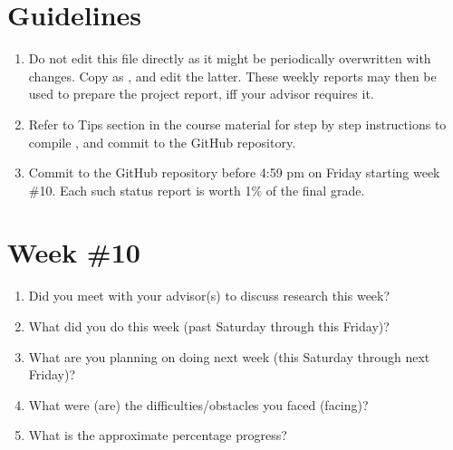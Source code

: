 \documentclass[letterpaper,12pt,fleqn]{article}
\begin{document}
\thispagestyle{empty}

\statustitle

\section*{Guidelines}

\begin{enumerate}
  \item Do not edit this file directly as it might be periodically
        overwritten with changes. Copy  as 
        , and edit the latter. These weekly
        reports may then be used to prepare the project report, iff your
        advisor requires it.
  \item Refer to \textsf{Tips} section in the course material for step by
        step instructions to compile , 
        and commit  to the GitHub repository.
  \item Commit  to the GitHub repository 
        before 4:59 pm on Friday starting week \#10. Each such status report 
        is worth 1\% of the final grade.
\end{enumerate}

\clearpage
\section*{Week \#10}

\begin{spacing}{1.50}
  \begin{enumerate}
    \item Did you meet with your advisor(s) to discuss research this week?
          \vfill

    \item What did you do this week (past Saturday through this Friday)? 
          \vfill

    \item What are you planning on doing next week (this Saturday through next Friday)? 
          \vfill

    \item What were (are) the difficulties/obstacles you faced (facing)?
          \vfill

    \item What is the approximate percentage progress?
          \vfill
  \end{enumerate}
\end{spacing}
\end{document}
